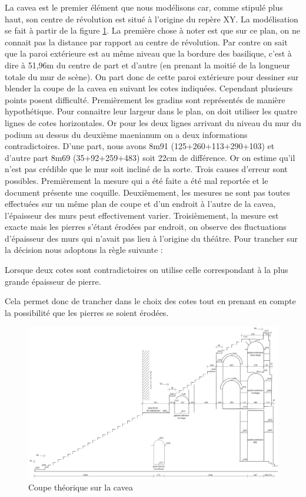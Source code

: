La \gls{cavea} est le premier élément que nous modélisons car, comme stipulé plus haut, son centre de révolution est situé à l'origine du repère XY. La modélisation se fait à partir de la figure \ref{coupeCavea}. La première chose à noter est que sur ce plan, on ne connait pas la distance par rapport au centre de révolution. Par contre on sait que la paroi extérieure est au même niveau que la bordure des \gls{basilique}, c'est à dire à 51,96m du centre de part et d'autre (en prenant la moitié de la longueur totale du mur de scène). On part donc de cette paroi extérieure pour dessiner sur blender la coupe de la \gls{cavea} en suivant les cotes indiquées. Cependant plusieurs points posent difficulté. Premièrement les gradins sont représentés de manière hypothétique. Pour connaitre leur largeur dans le plan, on doit utiliser les quatre lignes de cotes horizontales. Or pour les deux lignes arrivant du niveau du mur du podium au dessus du deuxième \gls{maenianum} on a deux informations contradictoires. D'une part, nous avons 8m91 (125+260+113+290+103) et d'autre part 8m69 (35+92+259+483) soit 22cm de différence. Or on estime qu'il n'est pas crédible que le mur soit incliné de la sorte. Trois causes d'erreur sont possibles. Premièrement la mesure qui a été faite a été mal reportée et le document présente une coquille. Deuxièmement, les mesures ne sont pas toutes effectuées sur un même plan de coupe et d'un endroit à l'autre de la cavea, l'épaisseur des murs peut effectivement varier. Troisièmement, la mesure est exacte mais les pierres s'étant érodées par endroit, on observe des fluctuations d'épaisseur des murs qui n'avait pas lieu à l'origine du théâtre. Pour trancher sur la décision nous adoptons la règle suivante :

\begin{theo}\label{epaisseur}
	Lorsque deux cotes sont contradictoires on utilise celle correspondant à la plus grande épaisseur de pierre.
\end{theo}

Cela permet donc de trancher dans le choix des cotes tout en prenant en compte la possibilité que les pierres se soient érodées.

\begin{figure}[!h]
	\includegraphics[width=\linewidth]{images/CoupeCavea}
	\caption[Coupe théorique sur la \gls{cavea}]{Coupe théorique sur la \gls{cavea} \cite[Pl. LX]{orangePl}} 
	\label{coupeCavea} 
\end{figure} 

